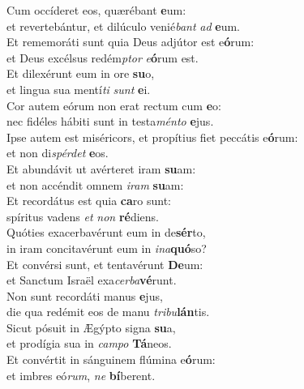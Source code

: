 \evenverse Cum occíderet eos, quærébant \textbf{e}um:~\*\\
\evenverse et revertebántur, et dilúculo venié\textit{bant} \textit{ad} \textbf{e}um.\\
\oddverse Et rememoráti sunt quia Deus adjútor est e\textbf{ó}rum:~\*\\
\oddverse et Deus excélsus redém\textit{ptor} \textit{e}\textbf{ó}rum est.\\
\evenverse Et dilexérunt eum in ore \textbf{su}o,~\*\\
\evenverse et lingua sua mentí\textit{ti} \textit{sunt} \textbf{e}i.\\
\oddverse Cor autem eórum non erat rectum cum \textbf{e}o:~\*\\
\oddverse nec fidéles hábiti sunt in testa\textit{mén}\textit{to} \textbf{e}jus.\\
\evenverse Ipse autem est miséricors, et propítius fiet peccátis e\textbf{ó}rum:~\*\\
\evenverse et non di\textit{spér}\textit{det} \textbf{e}os.\\
\oddverse Et abundávit ut avérteret iram \textbf{su}am:~\*\\
\oddverse et non accéndit omnem \textit{i}\textit{ram} \textbf{su}am:\\
\evenverse Et recordátus est quia \textbf{ca}ro sunt:~\*\\
\evenverse spíritus vadens \textit{et} \textit{non} \textbf{ré}diens.\\
\oddverse Quóties exacerbavérunt eum in de\textbf{sér}to,~\*\\
\oddverse in iram concitavérunt eum in \textit{i}\textit{na}\textbf{quó}so?\\
\evenverse Et convérsi sunt, et tentavérunt \textbf{De}um:~\*\\
\evenverse et Sanctum Israël exa\textit{cer}\textit{ba}\textbf{vé}runt.\\
\oddverse Non sunt recordáti manus \textbf{e}jus,~\*\\
\oddverse die qua redémit eos de manu \textit{tri}\textit{bu}\textbf{lán}tis.\\
\evenverse Sicut pósuit in Ægýpto signa \textbf{su}a,~\*\\
\evenverse et prodígia sua in \textit{cam}\textit{po} \textbf{Tá}neos.\\
\oddverse Et convértit in sánguinem flúmina e\textbf{ó}rum:~\*\\
\oddverse et imbres eó\textit{rum}, \textit{ne} \textbf{bí}berent.\\
